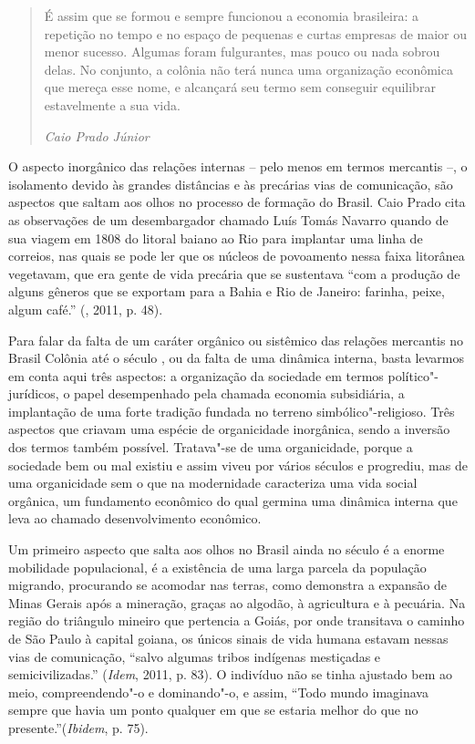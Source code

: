 \begin{quote}
É assim que se formou e sempre funcionou a economia brasileira: a
repetição no tempo e no espaço de pequenas e curtas empresas de maior ou
menor sucesso. Algumas foram fulgurantes, mas pouco ou nada sobrou
delas. No conjunto, a colônia não terá nunca uma organização econômica
que mereça esse nome, e alcançará seu termo sem conseguir equilibrar
estavelmente a sua vida.

\emph{Caio Prado Júnior}
\end{quote}

O aspecto inorgânico das relações internas -- pelo menos em termos
mercantis --, o isolamento devido às grandes distâncias e às precárias
vias de comunicação, são aspectos que saltam aos olhos no processo de
formação do Brasil. Caio Prado cita as observações de um desembargador
chamado Luís Tomás Navarro quando de sua viagem em 1808 do litoral
baiano ao Rio para implantar uma linha de correios, nas quais se pode
ler que os núcleos de povoamento nessa faixa litorânea vegetavam, que
era gente de vida precária que se sustentava ``com a produção de alguns
gêneros que se exportam para a Bahia e Rio de Janeiro: farinha, peixe,
algum café.'' (, 2011, p. 48).

Para falar da falta de um caráter orgânico ou sistêmico das relações
mercantis no Brasil Colônia até o século , ou da falta de uma
dinâmica interna, basta levarmos em conta aqui três aspectos: a
organização da sociedade em termos político"-jurídicos, o papel
desempenhado pela chamada economia subsidiária, a implantação de uma
forte tradição fundada no terreno simbólico"-religioso. Três aspectos que
criavam uma espécie de organicidade inorgânica, sendo a inversão dos
termos também possível. Tratava"-se de uma organicidade, porque a
sociedade bem ou mal existiu e assim viveu por vários séculos e
progrediu, mas de uma organicidade sem o que na modernidade caracteriza
uma vida social orgânica, um fundamento econômico do qual germina uma
dinâmica interna que leva ao chamado desenvolvimento econômico.

Um primeiro aspecto que salta aos olhos no Brasil ainda no século  é
a enorme mobilidade populacional, é a existência de uma larga parcela da
população migrando, procurando se acomodar nas terras, como demonstra a
expansão de Minas Gerais após a mineração, graças ao algodão, à
agricultura e à pecuária. Na região do triângulo mineiro que pertencia a
Goiás, por onde transitava o caminho de São Paulo à capital goiana, os
únicos sinais de vida humana estavam nessas vias de comunicação, ``salvo
algumas tribos indígenas mestiçadas e semicivilizadas.'' (\emph{Idem},
2011, p. 83). O indivíduo não se tinha ajustado bem ao meio,
compreendendo"-o e dominando"-o, e assim, ``Todo mundo imaginava sempre
que havia um ponto qualquer em que se estaria melhor do que no
presente.''(\emph{Ibidem}, p. 75).

